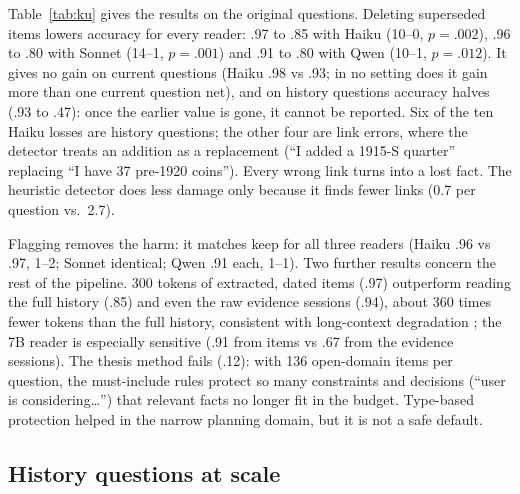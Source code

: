 \documentclass[11pt]{article}
\begin{document}
Table~\ref{tab:ku} gives the results on the original questions. Deleting superseded items lowers
accuracy for every reader: .97 to .85 with Haiku (10--0, $p=.002$), .96 to .80 with Sonnet (14--1,
$p=.001$) and .91 to .80 with Qwen (10--1, $p=.012$). It gives no gain on current questions (Haiku .98
vs .93; in no setting does it gain more than one current question net), and on history questions accuracy halves (.93 to .47): once the earlier value is gone, it
cannot be reported. Six of the ten Haiku losses are history questions; the other four are link
errors, where the detector treats an addition as a replacement (``I added a 1915-S quarter'' replacing
``I have 37 pre-1920 coins''). Every wrong link turns into a lost fact. The heuristic detector does less
damage only because it finds fewer links (0.7 per question vs.\ 2.7).

Flagging removes the harm: it matches keep for all three readers (Haiku .96 vs .97, 1--2; Sonnet
identical; Qwen .91 each, 1--1). Two further results concern the rest of the pipeline. 300 tokens of extracted, dated
items (.97) outperform reading the full history (.85) and even the raw evidence sessions (.94), about
360 times fewer tokens than the full history, consistent with long-context degradation
\citep{liu2024lost}; the 7B reader is especially sensitive (.91 from items vs .67 from the evidence
sessions). The thesis method fails (.12): with 136 open-domain items per question, the must-include
rules protect so many constraints and decisions (``user is considering\ldots'') that relevant facts no
longer fit in the budget. Type-based protection helped in the narrow planning domain, but it is not a
safe default.

\subsection{History questions at scale}
\label{sec:history}
\end{document}
